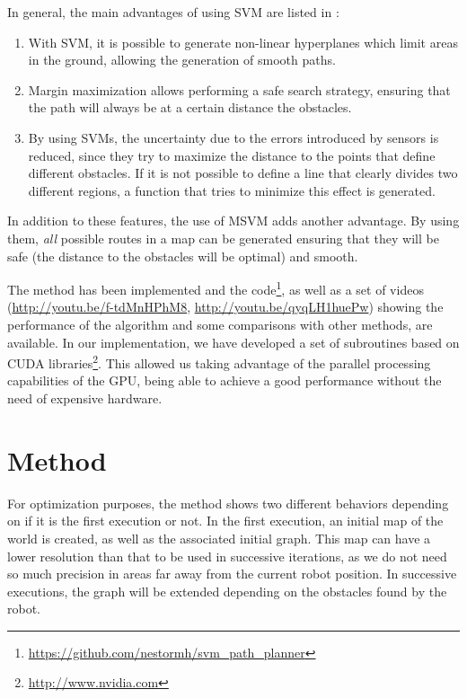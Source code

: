 In general, the main advantages of using \ac{SVM}  are listed in \cite{miura2006support}:

\begin{enumerate}
\item With \ac{SVM}, it is possible to generate non-linear hyperplanes which limit areas in the ground, allowing the generation of smooth paths.
\item Margin maximization allows performing a safe search strategy, ensuring that the path will always be at a certain distance the obstacles.
\item By using \acp{SVM}, the uncertainty due to the errors introduced by sensors is reduced, since they try to maximize the distance to the points that define different obstacles. If it is not possible to define a line that clearly divides two different regions, a function that tries to minimize this effect is generated.
\end{enumerate}

In addition to these features, the use of \acl{MSVM} adds another advantage.  By using them, \emph{all} possible routes in a map can be generated ensuring that they will be safe (the distance to the obstacles will be optimal) and smooth.

The method has been implemented and the code\footnote{\url{https://github.com/nestormh/svm_path_planner}}, as well as a set of videos (\url{http://youtu.be/f-tdMnHPhM8}, \url{http://youtu.be/qyqLH1huePw}) showing the performance of the algorithm and some comparisons with other methods, are available. In our implementation, we have developed a set of subroutines based on \acs{CUDA} libraries\footnote{\url{http://www.nvidia.com}}. This allowed us taking advantage of the parallel processing capabilities of the \ac{GPU}, being able to achieve a good performance without the need of expensive hardware.

\section{Method}\label{ch:chapter06_01}

For optimization purposes, the method shows two different behaviors depending on if it is the first execution or not. In the first execution, an initial map of the world is created, as well as the associated initial graph. This map can have a lower resolution than that to be used in successive iterations, as we do not need so much precision in areas far away from the current robot position. In successive executions, the graph will be extended depending on the obstacles found by the robot.

